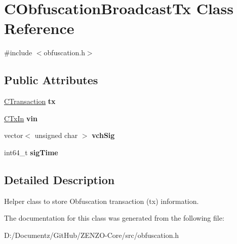 \hypertarget{class_c_obfuscation_broadcast_tx}{}\section{C\+Obfuscation\+Broadcast\+Tx Class Reference}
\label{class_c_obfuscation_broadcast_tx}


{\ttfamily \#include $<$obfuscation.\+h$>$}

\subsection*{Public Attributes}
\begin{DoxyCompactItemize}
\item 
\mbox{\label{class_c_obfuscation_broadcast_tx_a5a66cd30ee38f8826386df6a8ccbae90}} 
\mbox{\hyperlink{class_c_transaction}{C\+Transaction}} {\bfseries tx}
\item 
\mbox{\label{class_c_obfuscation_broadcast_tx_ac14d48764ae701b6bcf8d52e03ac28fc}} 
\mbox{\hyperlink{class_c_tx_in}{C\+Tx\+In}} {\bfseries vin}
\item 
\mbox{\label{class_c_obfuscation_broadcast_tx_a6094d39e3edd3d0519f6843dac316cde}} 
vector$<$ unsigned char $>$ {\bfseries vch\+Sig}
\item 
\mbox{\label{class_c_obfuscation_broadcast_tx_ad01d66b9192f9b36f0528ec77471b09f}} 
int64\+\_\+t {\bfseries sig\+Time}
\end{DoxyCompactItemize}


\subsection{Detailed Description}
Helper class to store Obfuscation transaction (tx) information. 

The documentation for this class was generated from the following file\+:\begin{DoxyCompactItemize}
\item 
D\+:/\+Documentz/\+Git\+Hub/\+Z\+E\+N\+Z\+O-\/\+Core/src/obfuscation.\+h\end{DoxyCompactItemize}
